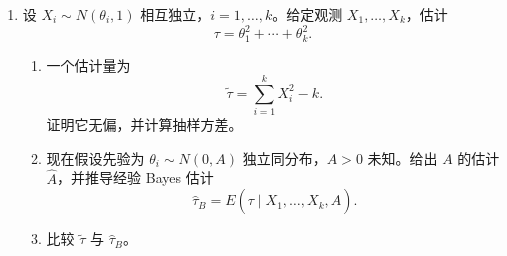 \documentclass[UTF8,12pt]{ctexart}
\begin{document}
\begin{enumerate}[label=\textbf{\arabic*.},leftmargin=2.2em]
\item 设 \(X_i\sim N(\theta_i,1)\) 相互独立，\(i=1,\ldots,k\)。给定观测 \(X_1,\ldots,X_k\)，估计
\[
\tau=\theta_1^2+\cdots+\theta_k^2.
\]
\begin{enumerate}[label=\textbf{(\arabic*)},leftmargin=2.4em]
\item 一个估计量为
\[
\widetilde\tau=\sum_{i=1}^kX_i^2-k.
\]
证明它无偏，并计算抽样方差。
\item 现在假设先验为 \(\theta_i\sim N(0,A)\) 独立同分布，\(A>0\) 未知。给出 \(A\) 的估计 \(\widehat A\)，并推导经验 Bayes 估计
\[
\widehat\tau_B=E(\tau\mid X_1,\ldots,X_k,\widehat A).
\]
\item 比较 \(\widetilde\tau\) 与 \(\widehat\tau_B\)。
\end{enumerate}
\end{enumerate}
\end{document}
